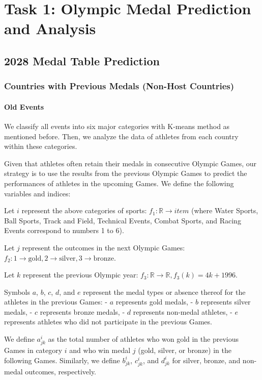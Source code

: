 \documentclass{mcmthesis}  %
\begin{document}
\section{Task 1: Olympic Medal Prediction and Analysis}
\subsection{2028 Medal Table Prediction}
\subsubsection{Countries with Previous Medals (Non-Host Countries)}
\paragraph{Old Events}
We classify all events into six major categories with K-means method as mentioned before. Then, we analyze the data of athletes from each country within these categories. 

Given that athletes often retain their medals in consecutive Olympic Games, our strategy is to use the results from the previous Olympic Games to predict the performances of athletes in the upcoming Games. We define the following variables and indices:

Let $i$ represent the above categories of sports: $f_1:\mathbb{R} \rightarrow item$ (where Water Sports, Ball Sports, Track and Field, Technical Events, Combat Sports, and Racing Events correspond to numbers 1 to 6).

Let $j$ represent the outcomes in the next Olympic Games: $f_2:1 \rightarrow \text{gold}, 2 \rightarrow \text{silver}, 3 \rightarrow \text{bronze}$.

Let $k$ represent the previous Olympic year: $f_3:\mathbb{R} \rightarrow \mathbb{R}, {f_3(k)=4k+1996}$.

Symbols $a$, $b$, $c$, $d$, and $e$ represent the medal types or absence thereof for the athletes in the previous Games:
- $a$ represents gold medals, 
- $b$ represents silver medals, 
- $c$ represents bronze medals, 
- $d$ represents non-medal athletes, 
- $e$ represents athletes who did not participate in the previous Games.

We define $a^i_{jk}$ as the total number of athletes who won gold in the previous Games in category $i$ and who win medal $j$ (gold, silver, or bronze) in the following Games. Similarly, we define $b^i_{jk}$, $c^i_{jk}$, and $d^i_{jk}$ for silver, bronze, and non-medal outcomes, respectively.
\end{document}
